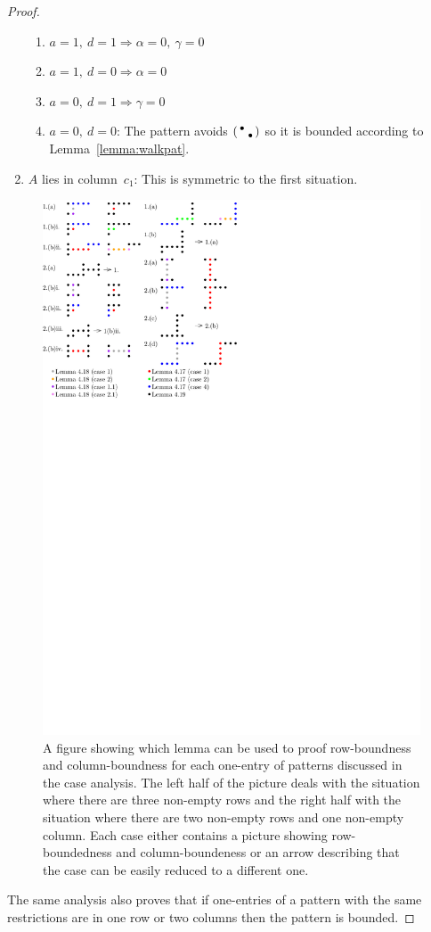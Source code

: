 \begin{proof}
\begin{enumerate}
	\begin{enumerate}
		\item $a=1,\ d=1\Rightarrow\alpha=0,\ \gamma=0$
		\item $a=1,\ d=0\Rightarrow\alpha=0$
		\item $a=0,\ d=1\Rightarrow\gamma=0$
		\item $a=0,\ d=0$: The pattern avoids $\left(\begin{smallmatrix}\bullet& \\ &\bullet\end{smallmatrix}\right)$ so it is bounded according to Lemma~\ref{lemma:walkpat}.
	\end{enumerate}
\item $A$ lies in column~$c_1$: This is symmetric to the first situation.
\end{enumerate}
\begin{figure}[!ht]
	\centering
	\includegraphics[width=120mm]{img/caseana.pdf}
	\caption{A figure showing which lemma can be used to proof row-boundness and column-boundness for each one-entry of patterns discussed in the case analysis. The left half of the picture deals with the situation where there are three non-empty rows and the right half with the situation where there are two non-empty rows and one non-empty column. Each case either contains a picture showing row-boundedness and column-boundeness or an arrow describing that the case can be easily reduced to a different one.}
	\label{fig:pictproof1}
\end{figure}
The same analysis also proves that if one-entries of a pattern with the same restrictions are in one row or two columns then the pattern is bounded.
\end{proof}

